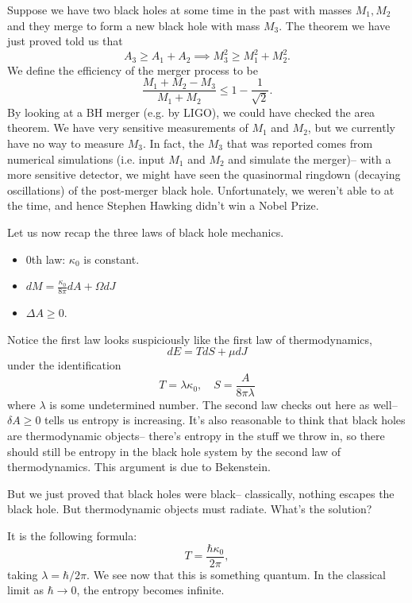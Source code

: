 Suppose we have two black holes at some time in the past with masses $M_1,M_2$ and they merge to form a new black hole with mass $M_3$. The theorem we have just proved told us that
\begin{equation}
    A_3 \geq A_1 +A_2 \implies M_3^2 \geq M_1^2 +M_2^2.
\end{equation}
We define the efficiency of the merger process to be
\begin{equation}
    \frac{M_1+M_2 -M_3}{M_1+M_2} \leq 1-\frac{1}{\sqrt{2}}.
\end{equation}
By looking at a BH merger (e.g. by LIGO), we could have checked the area theorem. We have very sensitive measurements of $M_1$ and $M_2$, but we currently have no way to measure $M_3$. In fact, the $M_3$ that was reported comes from numerical simulations (i.e. input $M_1$ and $M_2$ and simulate the merger)-- with a more sensitive detector, we might have seen the quasinormal ringdown (decaying oscillations) of the post-merger black hole. Unfortunately, we weren't able to at the time, and hence Stephen Hawking didn't win a Nobel Prize.

Let us now recap the three laws of black hole mechanics.
\begin{itemize}
    \item 0th law: $\kappa_0$ is constant.
    \item $dM=\frac{\kappa_0}{8\pi} dA + \Omega dJ$
    \item $\Delta A \geq 0$.
\end{itemize}
Notice the first law looks suspiciously like the first law of thermodynamics,
\begin{equation}
    dE = TdS + \mu dJ
\end{equation}
under the identification 
\begin{equation}
    T=\lambda \kappa_0, \quad S=\frac{A}{8\pi \lambda}
\end{equation}
where $\lambda$ is some undetermined number. The second law checks out here as well-- $\delta A \geq 0$ tells us entropy is increasing. It's also reasonable to think that black holes are thermodynamic objects-- there's entropy in the stuff we throw in, so there should still be entropy in the black hole system by the second law of thermodynamics. This argument is due to Bekenstein.

But we just proved that black holes were black-- classically, nothing escapes the black hole. But thermodynamic objects must radiate. What's the solution?

It is the following formula:
\begin{equation}
    T=\frac{\hbar \kappa_0}{2\pi},
\end{equation}
taking $\lambda=\hbar/2\pi$. We see now that this is something quantum. In the classical limit as $\hbar \to 0$, the entropy becomes infinite.


